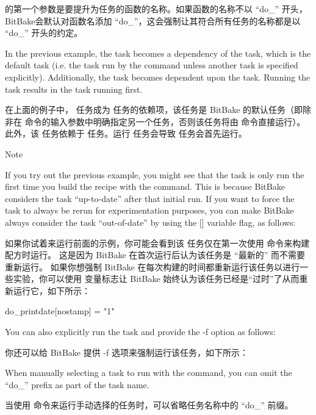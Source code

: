  的第一个参数是要提升为任务的函数的名称。如果函数的名称不以 ``do\_'' 开头，BitBake会默认对函数名添加 ``do\_''，这会强制让其符合所有任务的名称都是以 ``do\_'' 开头的约定。

In the previous example, the  task becomes a dependency of the  task, which is the default task (i.e. the task run by the  command unless another task is specified explicitly). Additionally, the  task becomes dependent upon the  task. Running the  task results in the  task running first.

在上面的例子中， 任务成为  任务的依赖项，该任务是 BitBake 的默认任务（即除非在  命令的输入参数中明确指定另一个任务，否则该任务将由  命令直接运行）。此外，该 任务依赖于  任务。运行  任务会导致  任务会首先运行。

\begin{noteblock}{Note}%

If you try out the previous example, you might see that the  task is only run the first time you build the recipe with the  command. This is because BitBake considers the task ``up-to-date'' after that initial run. If you want to force the task to always be rerun for experimentation purposes, you can make BitBake always consider the task ``out-of-date'' by using the [] variable flag, as follows:

\medskip
如果你试着来运行前面的示例，你可能会看到该  任务仅在第一次使用  命令来构建配方时运行。 这是因为 BitBake 在首次运行后认为该任务是 ``最新的'' 而不需要重新运行。 如果你想强制 BitBake 在每次构建的时间都重新运行该任务以进行一些实验，你可以使用 \code{[nostamp]} 变量标志让 BitBake 始终认为该任务已经是``过时''了从而重新运行它，如下所示：

\medskip
\begin{pyglist}
do_printdate[nostamp] = "1"
\end{pyglist}

\medskip
You can also explicitly run the task and provide the -f option as follows:

\medskip
你还可以给 BitBake 提供 -f 选项来强制运行该任务，如下所示：

\medskip
{}

\medskip
When manually selecting a task to run with the  command, you can omit the ``do\_'' prefix as part of the task name.

\medskip
当使用  命令来运行手动选择的任务时，可以省略任务名称中的 ``do\_'' 前缀。
\end{noteblock}

